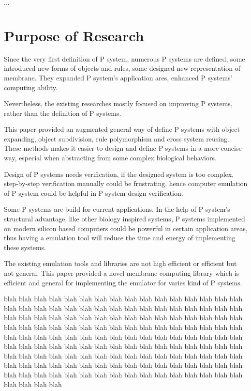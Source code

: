 \documentclass[9pt,a4paper,twoside]{article}
\begin{document}
         ...
    
    \section{Purpose of Research}
        Since the very first definition of P system, numerous P systems are defined, some introduced new forms of objects and rules, 
        some designed new representation of membrane. They expanded P system's application ares, enhanced P systems' computing ability.
        
        Nevertheless, the existing researches mostly focused on improving P systems, rather than the definition of P systems.
    
        This paper provided an augmented general way of define P systems with object expanding, object subdivision, rule polymorphism and cross system 
        reusing. These methods makes it easier to design and define P systems in a more concise way, especial 
        when abstracting from some complex biological behaviors. 
        
        Design of P systems needs verification, if the designed system is too complex, step-by-step verification manually could be 
        frustrating, hence computer emulation of P system could be helpful in P system design verification. 
    
        Some P systems are build for current applications. In the help of P system's structural advantage, like other biology inspired 
        systems, P systems implemented on modern silicon based computers could be powerful in certain application areas, thus having a emulation tool
        will reduce the time and energy of implementing these systems. 
        
        The existing emulation tools and libraries are not high efficient or efficient but not general. 
        This paper provided a novel membrane computing library which is efficient and general for implementing the emulator for varies kind of P systems.

        blah blah blah blah blah blah blah blah blah blah blah blah blah blah blah blah blah blah blah blah blah blah blah blah blah blah blah blah blah blah blah blah blah blah blah blah blah blah blah blah blah blah blah blah blah blah blah blah blah blah blah blah blah blah blah blah blah blah blah blah blah blah blah blah blah blah blah blah blah blah blah blah blah blah blah blah blah blah blah blah blah blah blah blah blah blah blah blah blah blah blah blah blah blah blah blah blah blah blah blah blah blah blah blah blah blah blah blah blah blah blah blah blah blah blah blah blah blah blah blah blah blah blah blah blah blah blah blah blah blah blah blah blah blah blah blah blah blah blah blah blah blah blah blah blah blah blah blah 
\end{document}

